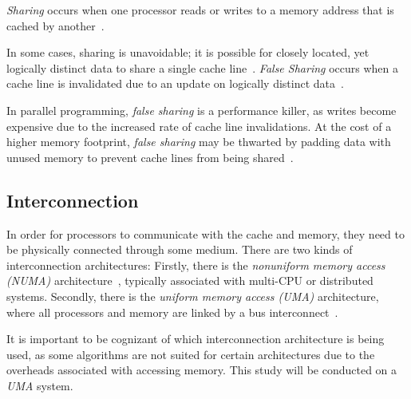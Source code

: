 \emph{Sharing} occurs when one processor reads or writes to a memory address that
is cached by another~\cite[Appendix~B.5.1]{herlihy2020art}.


In some cases, sharing is unavoidable; it is possible for closely located, yet
logically distinct data to share a single cache line~\cite[Appendix~B.5.1]{herlihy2020art}. \emph{False Sharing} occurs when
a cache line is invalidated due to an update on logically distinct data~\cite[Appendix~B.5.1]{herlihy2020art}. 

In parallel programming, \emph{false sharing} is a
performance killer, as writes become expensive due to the increased rate of
cache line invalidations. At the cost of a higher memory footprint, \emph{false
sharing} may be thwarted by padding data with unused memory to prevent cache
lines from being shared~\cite{scott2013shared}.

\subsection{Interconnection}
In order for processors to communicate with the cache and memory, they need to
be physically connected through some medium. There are two kinds of
interconnection architectures: Firstly, there is the \emph{nonuniform memory
access (NUMA)} architecture~\cite[Appendix~B.3]{herlihy2020art}, typically associated with multi-CPU or distributed
systems. Secondly, there is the \emph{uniform memory access (UMA)} architecture,
where all processors and memory are linked by a bus
interconnect~\cite[Appendix~B.3]{herlihy2020art}.

It is important to be cognizant of which interconnection architecture is being
used, as some algorithms are not suited for certain architectures due to the
overheads associated with accessing memory. This study will be
conducted on a \emph{UMA} system.

